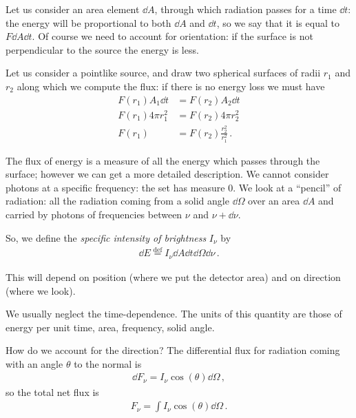 \documentclass[main.tex]{subfiles}
\begin{document}
Let us consider an area element \(\dd{A}\), through which radiation passes for a time \(\dd{t}\): the energy will be proportional to both \(\dd{A}\) and \(\dd{t}\), so we say that it is equal to \(F \dd{A} \dd{t}\). Of course we need to account for orientation: if the surface is not perpendicular to the source the energy is less. 

Let us consider a pointlike source, and draw two spherical surfaces of radii \(r_1 \) and \(r_2 \) along which we compute the flux: if there is no energy loss we must have 
%
\begin{subequations}
\begin{align}
F(r_1 ) A_1 \dd{t} &= F(r_2 ) A_2 \dd{t}  \\
 F(r_1 ) 4 \pi r_1^2 &= F(r_2 ) 4 \pi r_2^2 \\
 F(r_1 ) &= F(r_2 ) \frac{r_2^2}{r_1^2}
\,.
\end{align}
\end{subequations}

The flux of energy is a measure of all the energy which passes through the surface; however we can get a more detailed description. 
We cannot consider photons at a specific frequency: the set has measure 0. 
We look at a ``pencil'' of radiation: all the radiation coming from a solid angle \(\dd{\Omega  }\) over an area \(\dd{A}\) and carried by photons of frequencies between \(\nu \) and \(\nu + \dd{\nu }\).

So, we define the \emph{specific intensity of brightness} \(I_{\nu }\) by
%
\begin{align}
\dd{E} \overset{\text{def}}{=} I_{\nu } \dd{A} \dd{t} \dd{\Omega } \dd{\nu }
\,.
\end{align}

This will depend on position (where we put the detector area) and on direction (where we look). 

We usually neglect the time-dependence. The units of this quantity are those of energy per unit time, area, frequency, solid angle. 

How do we account for the direction? 
The differential flux for radiation coming with an angle \(\theta \) to the normal is 
%
\begin{align}
\dd{F_{\nu } } = I_{\nu  } \cos(\theta ) \dd{\Omega }
\,,
\end{align}
%
so the total net flux is 
%
\begin{align}
F_{\nu } = \int I_{\nu } \cos(\theta ) \dd{\Omega }
\,.
\end{align}
\end{document}
